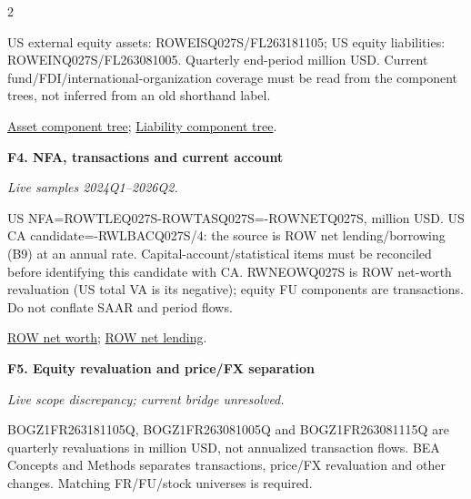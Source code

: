 \documentclass[10pt,a4paper,landscape]{article}
\begin{document}
\begin{multicols}{2}
\begin{minipage}{\linewidth}
US external equity assets: ROWEISQ027S/FL263181105; US equity liabilities: ROWEINQ027S/FL263081005. Quarterly end-period million USD. Current fund/FDI/international-organization coverage must be read from the component trees, not inferred from an old shorthand label.

\par \href{https://www.federalreserve.gov/apps/fof/SeriesAnalyzer.aspx?s=FL263181105&t=}{Asset component tree}; \href{https://www.federalreserve.gov/apps/fof/SeriesAnalyzer.aspx?s=FL263081005&t=}{Liability component tree}.

\end{minipage}\par\vspace{6pt}

\noindent\begin{minipage}{\linewidth}\raggedright

\hypertarget{src-F4}{\textbf{F4. NFA, transactions and current account}}\par

{\footnotesize\itshape Live samples 2024Q1--2026Q2.}\par

US NFA=ROWTLEQ027S-ROWTASQ027S=-ROWNETQ027S, million USD. US CA candidate=-RWLBACQ027S/4: the source is ROW net lending/borrowing (B9) at an annual rate. Capital-account/statistical items must be reconciled before identifying this candidate with CA. RWNEOWQ027S is ROW net-worth revaluation (US total VA is its negative); equity FU components are transactions. Do not conflate SAAR and period flows.

\par \href{https://fred.stlouisfed.org/series/ROWNETQ027S}{ROW net worth}; \href{https://fred.stlouisfed.org/series/RWLBACQ027S}{ROW net lending}.

\end{minipage}\par\vspace{6pt}

\noindent\begin{minipage}{\linewidth}\raggedright

\hypertarget{src-F5}{\textbf{F5. Equity revaluation and price/FX separation}}\par

{\footnotesize\itshape Live scope discrepancy; current bridge unresolved.}\par

BOGZ1FR263181105Q, BOGZ1FR263081005Q and BOGZ1FR263081115Q are quarterly revaluations in million USD, not annualized transaction flows. BEA Concepts and Methods separates transactions, price/FX revaluation and other changes. Matching FR/FU/stock universes is required.


\end{minipage}
\end{multicols}
\end{document}
